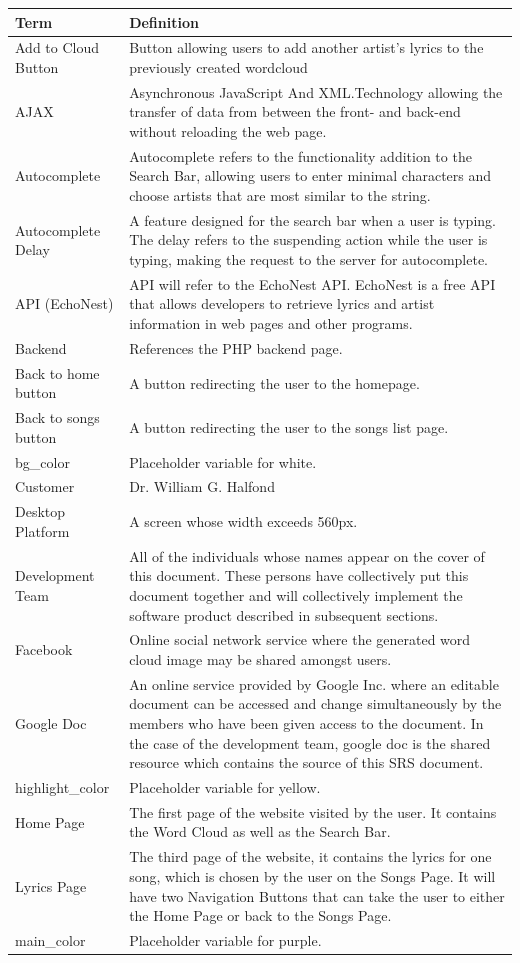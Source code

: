\documentclass[]{article}
\begin{document}
\begin{tabular}{p{4cm}|p{8cm}}
Term & Definition \\
\hline
Add to Cloud Button & Button allowing users to add another artist's lyrics to the previously created wordcloud \\
AJAX & Asynchronous JavaScript And XML.Technology allowing the transfer of data from between the front- and back-end without reloading the web page. \\
Autocomplete & Autocomplete refers to the functionality addition to the Search Bar, allowing users to enter minimal characters and choose artists that are most similar to the string. \\
Autocomplete Delay & A feature designed for the search bar when a user is typing. The delay refers to the suspending action while the user is typing, making the request to the server for autocomplete. \\
API (EchoNest) & API will refer to the EchoNest API. EchoNest is a free API that allows developers to retrieve lyrics and artist information in web pages and other programs. \\
Backend & References the PHP backend page. \\
Back to home button & A button redirecting the user to the homepage. \\
Back to songs button & A button redirecting the user to the songs list page. \\
bg\_color & Placeholder variable for white. \\
Customer & Dr. William G. Halfond \\
Desktop Platform & A screen whose width exceeds 560px. \\
Development Team & All of the individuals whose names appear on the cover of this document. These persons have collectively put this document together and will collectively implement the software product described in subsequent sections. \\
Facebook & Online social network service where the generated word cloud image may be shared amongst users. \\
Google Doc & An online service provided by Google Inc. where an editable document can be accessed and change simultaneously by the members who have been given access to the document. In the case of the development team, google doc is the shared resource which contains the source of this SRS document. \\
highlight\_color & Placeholder variable for yellow. \\
Home Page & The first page of the website visited by the user. It contains the Word Cloud as well as the Search Bar. \\
Lyrics Page & The third page of the website, it contains the lyrics for one song, which is chosen by the user on the Songs Page. It will have two Navigation Buttons that can take the user to either the Home Page or back to the Songs Page. \\
main\_color & Placeholder variable for purple. \\
\end{tabular}
\end{document}
